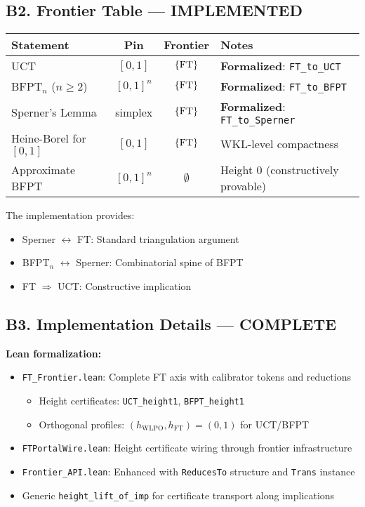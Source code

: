 \documentclass[11pt]{article}
\theoremstyle{definition}
\theoremstyle{remark}
\begin{document}
\subsection{B2. Frontier Table — \textbf{\color{green}IMPLEMENTED}}

\begin{center}
\begin{tabular}{l|c|c|p{5cm}}
\hline
\textbf{Statement} & \textbf{Pin} & \textbf{Frontier} & \textbf{Notes} \\
\hline
UCT & $[0,1]$ & $\{\mathrm{FT}\}$ & \textbf{\color{green}Formalized}: \texttt{FT\_to\_UCT} \\
BFPT$_n$ ($n \geq 2$) & $[0,1]^n$ & $\{\mathrm{FT}\}$ & \textbf{\color{green}Formalized}: \texttt{FT\_to\_BFPT} \\
Sperner's Lemma & simplex & $\{\mathrm{FT}\}$ & \textbf{\color{green}Formalized}: \texttt{FT\_to\_Sperner} \\
Heine-Borel for $[0,1]$ & $[0,1]$ & $\{\mathrm{FT}\}$ & WKL-level compactness \\
Approximate BFPT & $[0,1]^n$ & $\emptyset$ & Height 0 (constructively provable) \\
\hline
\end{tabular}
\end{center}

The implementation provides:
\begin{itemize}
\item Sperner $\leftrightarrow$ FT: Standard triangulation argument \cite{Fridman-Simpson}
\item BFPT$_n$ $\leftrightarrow$ Sperner: Combinatorial spine of BFPT
\item FT $\Rightarrow$ UCT: Constructive implication \cite{Ishihara-RM}
\end{itemize}

\subsection{B3. Implementation Details — \textbf{\color{green}COMPLETE}}

\textbf{Lean formalization:}
\begin{itemize}
\item \texttt{FT\_Frontier.lean}: Complete FT axis with calibrator tokens and reductions
  \begin{itemize}
  \item Height certificates: \texttt{UCT\_height1}, \texttt{BFPT\_height1}
  \item Orthogonal profiles: $(h_{\text{WLPO}}, h_{\text{FT}}) = (0, 1)$ for UCT/BFPT
  \end{itemize}
\item \texttt{FTPortalWire.lean}: Height certificate wiring through frontier infrastructure
\item \texttt{Frontier\_API.lean}: Enhanced with \texttt{ReducesTo} structure and \texttt{Trans} instance
\item Generic \texttt{height\_lift\_of\_imp} for certificate transport along implications
\end{itemize}
\end{document}

